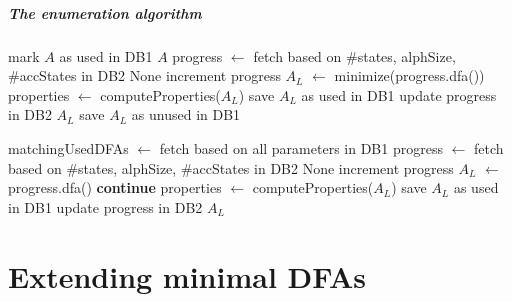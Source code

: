 \documentclass[a4paper, oneside, 11pt]{report}
\theoremstyle{definition}
\theoremstyle{remark}
\begin{document}
\paragraph*{The enumeration algorithm}

\vspace{0.2cm}
\begin{algorithmic}[1]
		\State mark $A$ as used in DB1
		\State \Return $A$
	\EndIf
	\State progress $\gets$ fetch based on \#states, alphSize, \#accStates in DB2
			\State \Return None
		\EndIf
		\State increment progress
		\State $A_L$ $\gets$ minimize(progress.dfa())
		\State properties $\gets$ computeProperties($A_L$)
				\State save $A_L$ as used in DB1
				\State update progress in DB2
				\State \Return $A_L$
			\Else
				\State save $A_L$ as unused in DB1
			\EndIf
		\EndIf
	\EndWhile
	\EndFunction
\end{algorithmic}
\vspace{0.2cm}

\vspace{0.2cm}
\begin{algorithmic}[1]
		\State matchingUsedDFAs $\gets$ fetch based on all parameters in DB1
		\State progress $\gets$ fetch based on \#states, alphSize, \#accStates in DB2
				\State \Return None
			\EndIf
			\State increment progress
			\State $A_L$ $\gets$ progress.dfa()
				\State \textbf{continue}
			\EndIf
			\State properties $\gets$ computeProperties($A_L$)
					\State save $A_L$ as used in DB1
					\State update progress in DB2
					\State \Return $A_L$
				\EndIf
			\EndIf
		\EndWhile
	\EndFunction
\end{algorithmic}
\vspace{0.2cm}

\chapter{Extending minimal DFAs}
\end{document}
